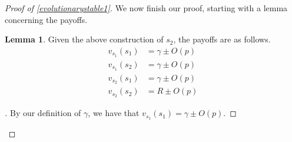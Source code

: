 \documentclass[11pt]{amsart}
\theoremstyle{definition}
\newtheorem{lemma}[theorem]{Lemma}
\theoremstyle{remark}
\newenvironment{subproof}[1][\proofname]{%
  \renewcommand{\qedsymbol}{$\blacksquare$}%
  \begin{proof}[#1]%
}{%
  \end{proof}%
}
\begin{document}
\begin{proof}[Proof of \cref{evolutionarystable1}]
      We now finish our proof, starting with a lemma concerning the payoffs.

      \begin{lemma}
        \label{claimpayoffs}
        Given the above construction of $s_2$, the payoffs are as follows.
      \begin{align*}
        v_{s_1}(s_1) &= \gamma \pm O(p) \\
        v_{s_1}(s_2) &= \gamma \pm O(p) \\
        v_{s_2}(s_1) &= \gamma \pm O(p) \\
        v_{s_2}(s_2) &= R \pm O(p)
      \end{align*}
      \end{lemma}
      \begin{subproof}

        By our definition of $\gamma$, we have that $v_{s_1}(s_1) = \gamma \pm O(p)$.


\end{subproof}
\end{proof}
\end{document}

